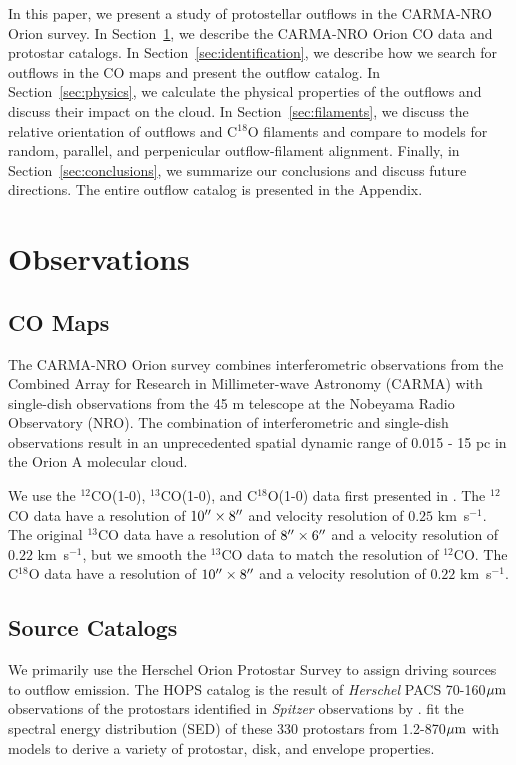 \documentclass[twocolumn]{aastex63}
\newcommand{\kms}{km~s$^{-1}$}
\newcommand{\co}[1][]{\ensuremath{^{#1}}CO}
\begin{document}
In this paper, we present a study of protostellar outflows in the CARMA-NRO Orion survey. In Section~\ref{sec:observations}, we describe the CARMA-NRO Orion CO data and protostar catalogs. In Section~\ref{sec:identification}, we describe how we search for outflows in the CO maps and present the outflow catalog. In Section~\ref{sec:physics}, we calculate the physical properties of the outflows and discuss their impact on the cloud. In Section~\ref{sec:filaments}, we discuss the relative orientation of outflows and C$^{18}$O filaments and compare to models for random, parallel, and perpenicular outflow-filament alignment. Finally, in Section~\ref{sec:conclusions}, we summarize our conclusions and discuss future directions. The entire outflow catalog is presented in the Appendix.

\section{Observations}\label{sec:observations}

\subsection{CO Maps}
The CARMA-NRO Orion survey combines interferometric observations from the Combined Array for Research in Millimeter-wave Astronomy (CARMA) with single-dish observations from the 45 m telescope at the Nobeyama Radio Observatory (NRO). The combination of interferometric and single-dish observations result in an unprecedented spatial dynamic range of 0.015 - 15 pc in the Orion A molecular cloud.

We use the \co[12](1-0), \co[13](1-0), and C$^{18}$O(1-0) data first presented in \citet{Kong18}. The \co[12]{} data have a resolution of $10\mbox{$^{\prime\prime}$}\times8\mbox{$^{\prime\prime}$}$ and velocity resolution of $0.25$ \kms{}. The original \co[13] data have a resolution of $8\mbox{$^{\prime\prime}$}\times6\mbox{$^{\prime\prime}$}$ and a velocity resolution of $0.22$ \kms{}, but we smooth the \co[13]{} data to match the resolution of \co[12]{}. The C$^{18}$O data have a resolution of $10\mbox{$^{\prime\prime}$}\times8\mbox{$^{\prime\prime}$}$ and a velocity resolution of $0.22$ \kms{}.

\subsection{Source Catalogs}
We primarily use the Herschel Orion Protostar Survey \citep[HOPS;][]{Furlan16} to assign driving sources to outflow emission. The HOPS catalog is the result of \emph{Herschel} PACS 70-160$\mbox{$\mu$m}{}$ observations of the protostars identified in \emph{Spitzer} observations by \citet{Megeath12}. \citet{Furlan16} fit the spectral energy distribution (SED) of these 330 protostars from 1.2-870$\mbox{$\mu$m}{}$ with models to derive a variety of protostar, disk, and envelope properties.
\end{document}
